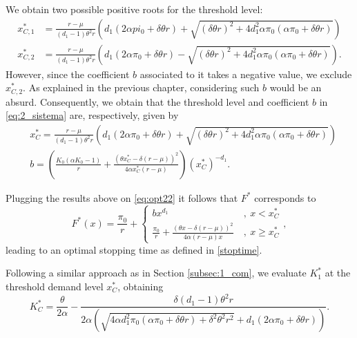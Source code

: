 We obtain two possible positive roots for the threshold level:
\begin{align*}
x^*_{C,1}&=\frac{r-\mu}{(d_1-1) \theta ^2 r}
\left(
d_1 \left(2 \alpha pi_0 + \delta  \theta  r \right) +
\sqrt{(\delta  \theta  r)^2 + 4 d_1^2 \alpha \pi_0 \left( \alpha \pi_0 +\delta  \theta  r \right)} \right)\\
x^*_{C,2}&=\frac{r-\mu}{(d_1-1) \theta ^2 r}
\left(
d_1 \left(2 \alpha \pi_0 + \delta  \theta  r \right) -
\sqrt{(\delta  \theta  r)^2 + 4 d_1^2 \alpha \pi_0 \left( \alpha \pi_0 +\delta  \theta  r \right)} \right).
\end{align*}
However, since the coefficient $b$ associated to it takes a negative value, we exclude $x^*_{C,2}$. As explained in the previous chapter, considering such $b$ would be an absurd. Consequently, we obtain that the threshold level and coefficient $b$ in \eqref{eq:2_sistema} are, respectively, given by
\begin{align}
&x_C^*=\frac{r-\mu}{(d_1-1) \theta ^2 r}
\left(
d_1 \left(2 \alpha \pi_0 + \delta  \theta  r \right) +
\sqrt{(\delta  \theta  r)^2 + 4 d_1^2 \alpha \pi_0 \left( \alpha \pi_0 +\delta  \theta  r \right)} \right) \label{eq:prob2_xC}\\
&b=\left( \frac{K_0 (\alpha  K_0-1)}{r}+\frac{(\theta  x^*_C-\delta  (r-\mu ))^2}{4 \alpha  x^*_C (r-\mu )} \right)(x_C^*)^{-d_1}. \nonumber
\end{align}

Plugging the results above on \eqref{eq:opt22} it follows that $F^*$ corresponds to
\begin{equation}
F^*(x)=\frac{\pi_0}{r}+\begin{cases} b x^{d_1}  &\ , \ x < x_C^* \\
\frac{\pi_0}{r}+ \frac{(\theta x -\delta (r-\mu))^2}{4 \alpha (r-\mu) x} &\ , \ x \geq  x_C^*
\end{cases},
\label{2_V*2}
\end{equation}
leading to an optimal stopping time as defined in \eqref{stoptime}.


Following a similar approach as in Section \ref{subsec:1_com}, we evaluate $K^*_1$ at the threshold demand level $x_C^*$, obtaining
\begin{equation}
K^*_C=\frac{\theta }{2 \alpha }-\frac{\delta  (d_1-1) \theta ^2 r}{2 \alpha  \left(\sqrt{4 \alpha  d_1^2 \pi_0 (\alpha  \pi_0+\delta  \theta  r)+\delta ^2 \theta ^2 r^2}+d_1 (2 \alpha  \pi_0+\delta  \theta  r)\right)}.
\label{3_K*}
\end{equation}


